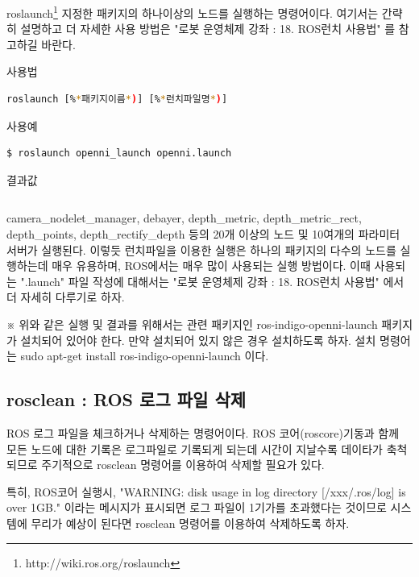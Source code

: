 roslaunch\footnote{http://wiki.ros.org/roslaunch} 지정한 패키지의 하나이상의 노드를 실행하는 명령어이다. 여기서는 간략히 설명하고 더 자세한 사용 방법은 "로봇 운영체제 강좌 : 18. ROS런치 사용법" 를 참고하길 바란다. 

\setcounter{num}{0}

\vspace{\baselineskip}
\noindent
{}\circled{\thenum} 사용법
\begin{lstlisting}[language=bash]
roslaunch [%*패키지이름*)] [%*런치파일명*)]
\end{lstlisting}

\noindent
{}\circled{\thenum} 사용예
\begin{lstlisting}[language=bash]
$ roslaunch openni_launch openni.launch 
\end{lstlisting}

\noindent
{}\circled{\thenum} 결과값
\begin{lstlisting}[language=bash]
%*생략*)
\end{lstlisting}

camera\_nodelet\_manager,  debayer,  depth\_metric,   depth\_metric\_rect, depth\_points, depth\_rectify\_depth 등의 20개 이상의 노드 및  10여개의 파라미터 서버가 실행된다. 이렇듯 런치파일을 이용한 실행은 하나의 패키지의 다수의 노드를 실행하는데 매우 유용하며, ROS에서는 매우 많이 사용되는 실행 방법이다. 이때 사용되는 ".launch" 파일 작성에 대해서는 "로봇 운영체제 강좌 : 18. ROS런치 사용법" 에서 더 자세히 다루기로 하자.

※ 위와 같은 실행 및 결과를 위해서는 관련 패키지인 ros-indigo-openni-launch 패키지가 설치되어 있어야 한다. 만약 설치되어 있지 않은 경우 설치하도록 하자. 설치 명령어는 sudo apt-get install ros-indigo-openni-launch  이다.

\subsection{rosclean : ROS 로그 파일 삭제}

ROS 로그 파일을 체크하거나 삭제하는 명령어이다. ROS 코어(roscore)기동과 함께 모든 노드에 대한 기록은 로그파일로 기록되게 되는데 시간이 지날수록 데이타가 축척되므로 주기적으로 rosclean 명령어를 이용하여 삭제할 필요가 있다.

특히, ROS코어 실행시, "WARNING: disk usage in log directory [/xxx/.ros/log] is over 1GB." 이라는 메시지가 표시되면 로그 파일이 1기가를 초과했다는 것이므로 시스템에 무리가 예상이 된다면 rosclean 명령어를 이용하여 삭제하도록 하자.

